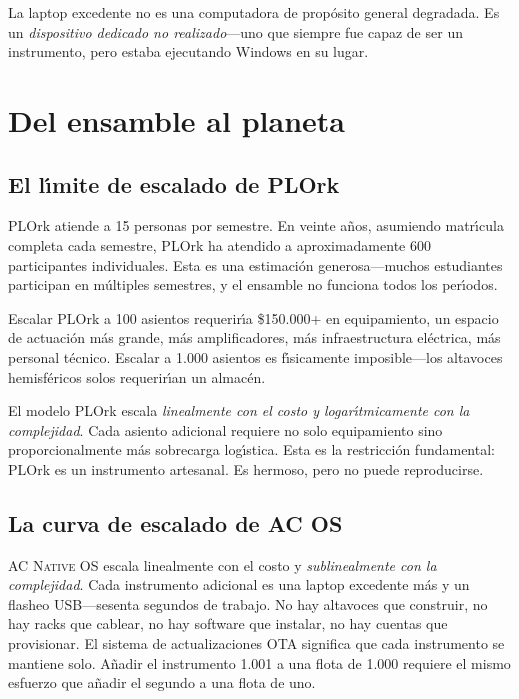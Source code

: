 \documentclass[10pt,letterpaper,twocolumn]{article}
\newcommand{\acos}{\textsc{AC Native OS}}
\begin{document}
La laptop excedente no es una computadora de prop\'{o}sito general degradada. Es un \emph{dispositivo dedicado no realizado}---uno que siempre fue capaz de ser un instrumento, pero estaba ejecutando Windows en su lugar.


\section{Del ensamble al planeta}
\label{sec:scaling}

\subsection{El l\'{\i}mite de escalado de PLOrk}

PLOrk atiende a 15 personas por semestre. En veinte a\~{n}os, asumiendo matr\'{\i}cula completa cada semestre, PLOrk ha atendido a aproximadamente 600 participantes individuales. Esta es una estimaci\'{o}n generosa---muchos estudiantes participan en m\'{u}ltiples semestres, y el ensamble no funciona todos los per\'{\i}odos.

Escalar PLOrk a 100 asientos requerir\'{\i}a \$150.000+ en equipamiento, un espacio de actuaci\'{o}n m\'{a}s grande, m\'{a}s amplificadores, m\'{a}s infraestructura el\'{e}ctrica, m\'{a}s personal t\'{e}cnico. Escalar a 1.000 asientos es f\'{\i}sicamente imposible---los altavoces hemisf\'{e}ricos solos requerir\'{\i}an un almac\'{e}n.

El modelo PLOrk escala \emph{linealmente con el costo y logar\'{\i}tmicamente con la complejidad}. Cada asiento adicional requiere no solo equipamiento sino proporcionalmente m\'{a}s sobrecarga log\'{\i}stica. Esta es la restricci\'{o}n fundamental: PLOrk es un instrumento artesanal. Es hermoso, pero no puede reproducirse.

\subsection{La curva de escalado de AC OS}

\acos{} escala linealmente con el costo y \emph{sublinealmente con la complejidad}. Cada instrumento adicional es una laptop excedente m\'{a}s y un flasheo USB---sesenta segundos de trabajo. No hay altavoces que construir, no hay racks que cablear, no hay software que instalar, no hay cuentas que provisionar. El sistema de actualizaciones OTA significa que cada instrumento se mantiene solo. A\~{n}adir el instrumento 1.001 a una flota de 1.000 requiere el mismo esfuerzo que a\~{n}adir el segundo a una flota de uno.
\end{document}
